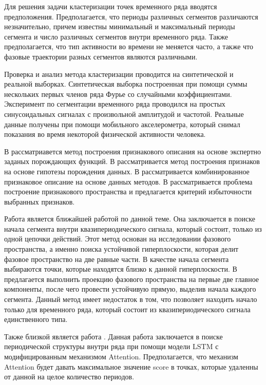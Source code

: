 Для решения задачи кластеризации точек временного ряда вводятся предположения. 
Предполагается, что периоды различных сегментов различаются незначительно, причем известны минимальный и максимальный периоды сегмента и число различных сегментов внутри временного ряда. 
Также предполагается, что тип активности во времени не меняется часто, а также что фазовые траектории разных сегментов являются различными. 

Проверка и анализ метода кластеризации проводится на синтетической и реальной выборках. 
Синтетическая выборка построенная при помощи суммы нескольких первых членов ряда Фурье со случайными коэффициентами. 
Эксперимент по сегментации временного ряда проводился на простых синусоидальных сигналах с произвольной амплитудой и частотой. 
Реальные данные получены при помощи мобильного акселерометра, который снимал показания во время некоторой физической активности человека. 

В \cite{kwapisz2010} рассматриавется метод построения признакового описания на основе экспертно заданых порождающих функций.
В \cite{lukashin2003} рассматривается метод построения признаков на основе гипотезы порождения данных. 
В \cite{Ivkin2015} рассматривается комбинированное признаковое описание на основе данных методов. 
В \cite{Katrutsa2015} рассматривается проблема построение признакового пространства и предлагается критерий избыточности выбранных признаков.

Работа \cite{motrenko2015} является ближайшей работой по данной теме. Она заключается в поиске начала сегмента внутри квазипериодического сигнала, который состоит, только из одной цепочки действий. Этот метод основан на исследовании фазового пространства, а именно поиска устойчивой гиперплоскости, которая делит фазовое пространство на две равные части. В качестве начала сегмента выбираются точки, которые находятся близко к данной гиперплоскости. В \cite{motrenko2015} предлагается выполнить проекцию фазового пространства на первые две главное компоненты, после чего провести устойчивую прямую, выделив начала каждого сегмента. 
Данный метод имеет недостаток в том, что позволяет находить начало только для временного ряда, который состоит из квазипериодического сигнала единственного типа.


Также близкой является работа \cite{cinar2018}.  Данная работа заключается в поиске периодической структуры внутри ряда при помощи модели LSTM с модифицированным механизмом Attention. Предполагается, что механизм Attention будет давать максимальное значение score в точках, которые удаленны от данной на целое количество периодов.

